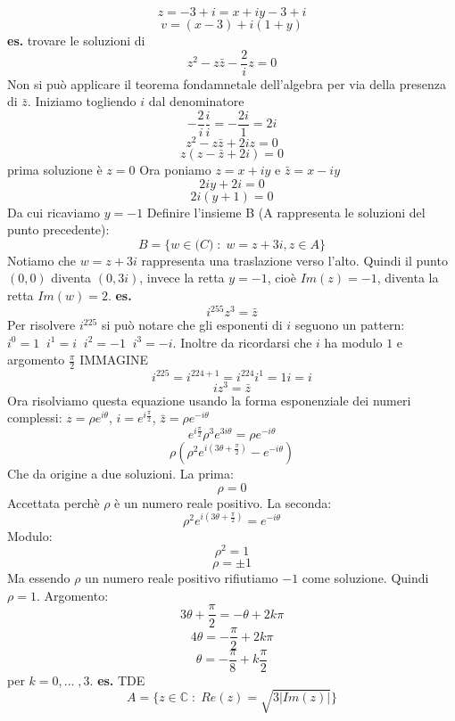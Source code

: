 \[
    z = -3+i = x +iy-3+i
\] 
\[
    v = (x-3) +i (1+y)
\] 
\newline
\textbf{es.} trovare le soluzioni di
\[
    z^2-z\bar{z}-\frac{2}{i}z = 0
\] 
Non si può applicare il teorema fondamnetale dell'algebra per via della presenza di $\bar{z}$.
\newline
Iniziamo togliendo $i$ dal denominatore
\[
    -\frac{2}{i}\frac{i}{i} = -\frac{2i}{1} = 2i
\] 
\[
    z^2 -z \bar{z} + 2iz = 0
\] 
\[
    z(z-\bar{z} + 2i) = 0
\] 
prima soluzione è $z=0$
\newline
Ora poniamo $z= x+iy$ e $\bar{z}=x-iy$
\[
    2iy +2i = 0
\] 
\[
    2i(y+1) = 0
\] 
Da cui ricaviamo $y = -1$
\newline
Definire l'insieme B (A rappresenta le soluzioni del punto precedente):
\[
    B = \{w \in \mathbb(C) \;:\; w = z+3i, z \in A \}
\] 
Notiamo che $w = z+3i$ rappresenta una traslazione verso l'alto. Quindi il punto $(0,0)$ diventa $(0,3i)$, invece la retta $y = -1$, cioè $Im(z) = -1$, diventa la retta $Im(w) = 2$.
\newline
\newline
\textbf{es.} 
\[
    i ^ {255} z^3 = \bar{z}
\] 
Per risolvere $i^{225}$ si può notare che gli esponenti di $i$ seguono un pattern: $i^0 = 1 \;\; i^1 = i \;\; i^2 = -1 \;\; i^3 = -i$. Inoltre da ricordarsi che $i$ ha modulo $1$ e argomento $\frac{\pi}{2}$
\newline
IMMAGINE
\newline
\[
    i^{225} = i^{224+1} = i^{224} i^{1} = 1i = i
\] 
\[
    iz^3 = \bar{z}    
\] 
Ora risolviamo questa equazione usando la forma esponenziale dei numeri complessi: $z=\rho e ^ {i\theta}$, $i=e^{i\frac{\pi}{2}}$, $\bar{z} = \rho e^{-i\theta}$
\[
    e ^{i\frac{\pi}{2}}\rho^3 e^{3i\theta} = \rho e^{-i\theta}
\] 
\[
    \rho (\rho ^2 e^{i(3\theta + \frac{\pi}{2})} - e ^{-i\theta})
\] 
Che da origine a due soluzioni. La prima:
\[
    \rho = 0
\] 
Accettata perchè $\rho$ è un numero reale positivo. La seconda:
\[
    \rho ^ 2 e ^{i(3\theta + \frac{\pi}{2})}= e^{-i\theta}
\] 
Modulo:
\[
    \rho ^ 2 = 1
\] 
\[
    \rho = \pm 1
\] 
Ma essendo $\rho$ un numero reale positivo rifiutiamo $-1$ come soluzione. Quindi $\rho = 1$.
\newline
Argomento:
\[
    3 \theta + \frac{\pi}{2} = -\theta + 2k\pi
\] 
\[
    4\theta = -\frac{\pi}{2} + 2k\pi
\] 
\[
    \theta = -\frac{\pi}{8} +k\frac{\pi}{2}    
\] 
per $k = 0,\dots \;,3$.
\newline
\textbf{es.} TDE
\[
    A =\{z \in \mathbb{C} \;:\; Re(z) = \sqrt{3|Im(z)|}\}
\] 
